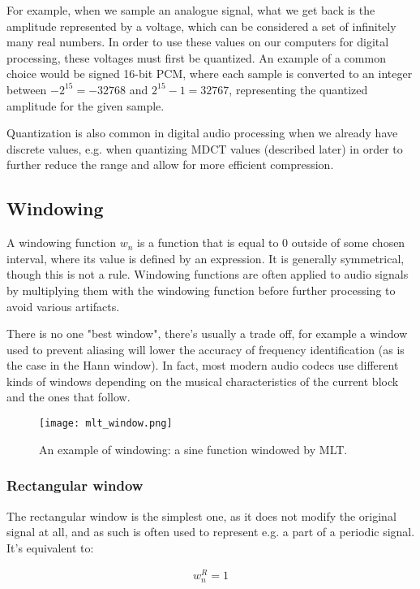 For example, when we sample an analogue signal, what we get back is the amplitude represented by a voltage, which can be considered a set of infinitely many real numbers. In order to use these values on our computers for digital processing, these voltages must first be quantized. \cite{bosi_goldberg_2003} An example of a common choice would be signed 16-bit PCM, where each sample is converted to an integer between $-2^{15} = -32768$ and $2^{15}-1 = 32767$, representing the quantized amplitude for the given sample.

Quantization is also common in digital audio processing when we already have discrete values, e.g. when quantizing MDCT values (described later) in order to further reduce the range and allow for more efficient compression.

\subsection{Windowing}
A windowing function $w_n$ is a function that is equal to $0$ outside of some chosen interval, where its value is defined by an expression. It is generally symmetrical, though this is not a rule. Windowing functions are often applied to audio signals by multiplying them with the windowing function before further processing to avoid various artifacts.

There is no one "best window", there's usually a trade off, for example a window used to prevent aliasing will lower the accuracy of frequency identification (as is the case in the Hann window). \cite{bosi_goldberg_2003} In fact, most modern audio codecs use different kinds of windows depending on the musical characteristics of the current block and the ones that follow. \cite{Raissi2002TheTB}

\begin{figure}[ht]
	\caption[Windowing example]{An example of windowing: a sine function windowed by MLT.}
	\centering
	\texttt{[image: mlt\_window.png]}
\end{figure}

\subsubsection{Rectangular window}
The rectangular window is the simplest one, as it does not modify the original signal at all, and as such is often used to represent e.g. a part of a periodic signal. It's equivalent to:

\begin{align}
w_n^R = 1
\end{align}

